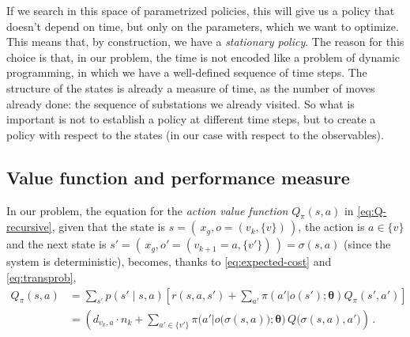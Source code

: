 If we search in this space of parametrized policies, this will give us a policy that doesn't depend on time, but only on the parameters, which we want to optimize. This means that, by construction, we have a \emph{stationary policy}. The reason for this choice is that, in our problem, the time is not encoded like a problem of dynamic programming, in which we have a well-defined sequence of time steps. The structure of the states is already a measure of time, as the number of moves already done: the sequence of substations we already visited. So what is important is not to establish a policy at different time steps, but to create a policy with respect to the states (in our case with respect to the observables).


\subsection{Value function and performance measure}

In our problem, the equation for the \emph{action value function} $Q_\pi(s,a)$ in \eqref{eq:Q-recursive}, given that the state is $s = ( \, x_g, o = (v_k, \{v\}) \, )$, the action is $a \in \{v\}$ and the next state is $s' = ( \, x_g, o' = (v_{k+1}=a, \{v'\}) \, ) = \sigma(s,a)$ (since the system is deterministic), becomes, thanks to \eqref{eq:expected-cost} and \eqref{eq:transprob},
\begin{equation}
    \begin{aligned}
        Q_\pi(s,a)
        &= \sum_{s'} p(s' \mid s, a) \left[ r(s,a,s') + \sum_{a'} \pi(a'|o(s'); \boldsymbol \theta)  Q_\pi (s', a') \right] \\
        &= \left(d_{v_k, a} \cdot n_{k} + \sum_{a' \in \{v'\}} \pi \Big( a' \big| o \big( \sigma(s,a) \big); \boldsymbol \theta \Big) \, Q \big( \sigma(s,a), a' \big) \right) \, .
    \end{aligned}
    \label{eq:myQ}
\end{equation}

